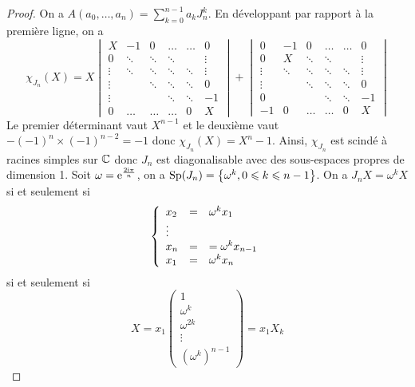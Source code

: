 \documentclass[12pt]{article}
\begin{document}
\begin{proof}
	On a $A(a_{0},\dots,a_{n})=\sum_{k=0}^{n-1}a_{k}J_{n}^{k}$. En développant par rapport à la première ligne, on a 
	\begin{equation}
		\chi_{J_{n}}(X)=X
		\begin{vmatrix}
			X&-1&0&\dots&\dots&0\\
			0&\ddots&\ddots&\ddots&&\vdots\\
			\vdots&\ddots&\ddots&\ddots&\ddots&\vdots\\
			\vdots&&\ddots&\ddots&\ddots&0\\
			\vdots&&&\ddots&\ddots&-1\\
			0&\dots&\dots&\dots&0&X
		\end{vmatrix}+
		\begin{vmatrix}
			0&-1&0&\dots&\dots&0\\
			0&X&\ddots&\ddots&&\vdots\\
			\vdots&\ddots&\ddots&\ddots&\ddots&\vdots\\
			\vdots&&\ddots&\ddots&\ddots&0\\
			0&&&\ddots&\ddots&-1\\
			-1 &0&\dots&\dots&0&X
		\end{vmatrix}
	\end{equation}
	Le premier déterminant vaut $X^{n-1}$ et le deuxième vaut $-(-1)^{n}\times(-1)^{n-2}=-1$ donc $\chi_{J_{n}}(X)=X^{n}-1$.
	Ainsi, $\chi_{J_{n}}$ est scindé à racines simples sur $\mathbb{C}$ donc $J_{n}$ est diagonalisable avec des sous-espaces propres de dimension 1. Soit $\omega=\mathrm{e}^{\frac{2\mathrm{i}\pi}{n}}$, on a $\operatorname{Sp}(J_{n})=\left\lbrace\omega^{k},0\leqslant k\leqslant n-1\right\rbrace$. On a $J_{n}X=\omega^{k}X$ si et seulement si 
	\begin{equation}
		\left\lbrace
			\begin{array}[]{lll}
				x_{2}&=&\omega^{k}x_{1}\\
				\vdots\\
				x_{n}&=&=\omega^{k}x_{n-1}\\
				x_{1}&=&\omega^{k}x_{n}
			\end{array}
		\right.
	\end{equation}
	si et seulement si 
	\begin{equation}
		X=x_{1}\begin{pmatrix}
			1\\
			\omega^{k}\\
			\omega^{2k}\\
			\vdots\\
			(\omega^{k})^{n-1}
		\end{pmatrix}=x_{1}X_{k}

\end{equation}
\end{proof}
\end{document}
